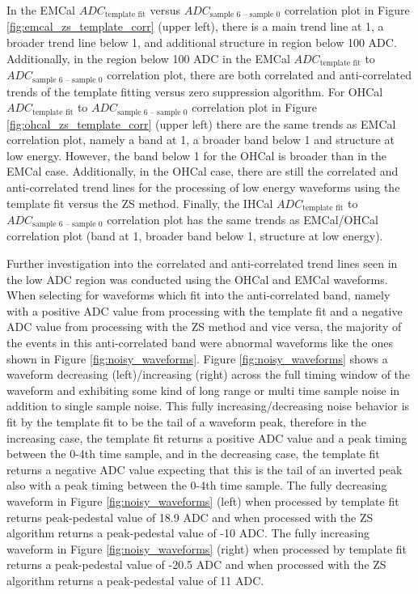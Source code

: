 In the EMCal $ADC_{\text{template fit}}$ versus $ADC_{\text{sample 6 – sample 0}}$ correlation plot in Figure \ref{fig:emcal_zs_template_corr} (upper left), there is a main trend line at 1, a broader trend line below 1, and additional structure in region below 100 ADC. 
Additionally, in the region below 100 ADC in the EMCal $ADC_{\text{template fit}}$ to $ADC_{\text{sample 6 – sample 0}}$ correlation plot, there are both correlated and anti-correlated trends of the template fitting versus zero suppression algorithm. 
For OHCal $ADC_{\text{template fit}}$ to $ADC_{\text{sample 6 – sample 0}}$ correlation plot in Figure \ref{fig:ohcal_zs_template_corr} (upper left) there are the same trends as EMCal correlation plot, namely a band at 1, a broader band below 1 and structure at low energy. 
However, the band below 1 for the OHCal is broader than in the EMCal case. Additionally, in the OHCal case, there are still the correlated and anti-correlated trend lines for the processing of low energy waveforms using the template fit versus the ZS method. 
Finally, the IHCal $ADC_{\text{template fit}}$ to $ADC_{\text{sample 6 – sample 0}}$ correlation plot has the same trends as EMCal/OHCal correlation plot (band at 1, broader band below 1, structure at low energy).

Further investigation into the correlated and anti-correlated trend lines seen in the low ADC region was conducted using the OHCal and EMCal waveforms. 
When selecting for waveforms which fit into the anti-correlated band, namely with a positive ADC value from processing with the template fit and a negative ADC value from processing with the ZS method and vice versa, the majority of the events in this anti-correlated band were abnormal waveforms like the ones shown in Figure \ref{fig:noisy_waveforms}. 
Figure \ref{fig:noisy_waveforms} shows a waveform decreasing (left)/increasing (right) across the full timing window of the waveform and exhibiting some kind of long range or multi time sample noise in addition to single sample noise. 
This fully increasing/decreasing noise behavior is fit by the template fit to be the tail of a waveform peak, therefore in the increasing case, the template fit returns a positive ADC value and a peak timing between the 0-4th time sample, and in the decreasing case, the template fit returns a negative ADC value expecting that this is the tail of an inverted peak also with a peak timing between the 0-4th time sample. 
The fully decreasing waveform in Figure \ref{fig:noisy_waveforms} (left) when processed by template fit returns peak-pedestal value of 18.9 ADC and when processed with the ZS algorithm returns a peak-pedestal value of -10 ADC.
The fully increasing waveform in Figure \ref{fig:noisy_waveforms} (right) when processed by template fit returns a peak-pedestal value of -20.5 ADC and when processed with the ZS algorithm returns a peak-pedestal value of 11 ADC.

